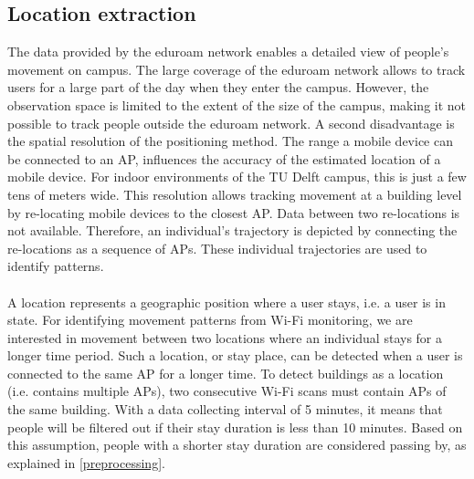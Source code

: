 \subsection{Location extraction}
The data provided by the eduroam network enables a detailed view of people’s movement on campus. The large coverage of the eduroam network allows to track users for a large part of the day when they enter the campus. However, the observation space is limited to the extent of the size of the campus, making it not possible to track people outside the eduroam network. A second disadvantage is the spatial resolution of the positioning method. The range a mobile device can be connected to an AP,  influences the accuracy of the estimated location of a mobile device. For indoor environments of the TU Delft campus, this is just a few tens of meters wide. This resolution allows tracking movement at a building level by re-locating mobile devices to the closest AP. Data between two re-locations is not available. Therefore, an individual’s trajectory is depicted by connecting the re-locations as a sequence of APs. These individual trajectories are used to identify patterns. \\\\
A location represents a geographic position where a user stays, i.e. a user is in state. For identifying movement patterns from Wi-Fi monitoring, we are interested in movement between two locations where an individual stays for a longer time period. Such a location, or stay place, can be detected when a user is connected to the same AP for a longer time. To detect  buildings as a location (i.e. contains multiple APs), two consecutive Wi-Fi scans must contain  APs of the same building. With a data collecting interval of 5 minutes, it means that people will be filtered out if their stay duration is less than 10 minutes. Based on this assumption, people with a shorter stay duration are considered passing by, as explained in \autoref{preprocessing}.

